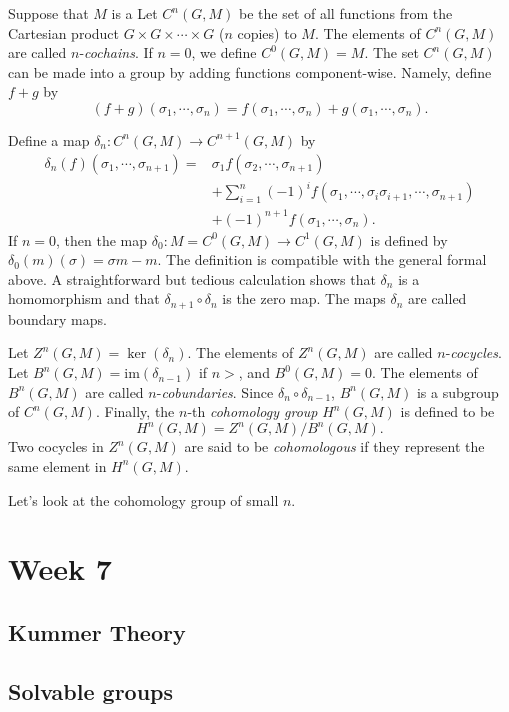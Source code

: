 \documentclass[12pt]{report}
\theoremstyle{definition}
\def\im{\text{im}}
\begin{document}
Suppose that $M$ is a Let $C^n(G,M)$ be the set of all functions from the Cartesian product $G\times G\times\cdots\times G$ ($n$ copies) to $M$. The elements of $C^n(G,M)$ are called $n$-\emph{cochains}. If $n=0$, we define $C^0(G,M)=M$. The set $C^n(G,M)$ can be made into a group by adding functions component-wise. Namely, define $f+g$  by $$(f+g)(\sigma_1,\cdots,\sigma_n)=f(\sigma_1,\cdots,\sigma_n)+g(\sigma_1,\cdots,\sigma_n).$$

Define a map $\delta_n: C^n(G,M)\to C^{n+1}(G,M)$ by \begin{align*}
    \delta_n(f)(\sigma_1,\cdots,\sigma_{n+1})=&\sigma_1f(\sigma_2,\cdots,\sigma_{n+1}) \\
    &+\sum_{i=1}^n(-1)^if(\sigma_1,\cdots,\sigma_i\sigma_{i+1},\cdots,\sigma_{n+1}) \\
    &+ (-1)^{n+1} f(\sigma_1,\cdots,\sigma_n).
\end{align*}
If $n=0$, then the map $\delta_0: M=C^0(G,M)\to C^1(G,M)$ is defined by $\delta_0(m)(\sigma)=\sigma m-m$. The definition is compatible with the general formal above. A straightforward but tedious calculation shows that $\delta_n$ is a homomorphism and that $\delta_{n+1}\circ\delta_n$ is the zero map. The maps $\delta_n$ are called boundary maps.


Let $Z^n(G,M)=\ker(\delta_n)$. The elements of $Z^n(G,M)$ are called $n$-\emph{cocycles}. Let $B^n(G,M)=\im(\delta_{n-1})$ if $n>$, and $B^0(G,M)=0$. The elements of $B^n(G,M)$ are called $n$-\emph{cobundaries}. Since $\delta_n\circ\delta_{n-1}$, $B^n(G,M)$ is a subgroup of $C^n(G,M)$. Finally, the $n$-th \emph{cohomology group} $H^n(G,M)$ is defined to be $$H^n(G,M)=Z^n(G,M)/B^n(G,M).$$ Two cocycles in $Z^n(G,M)$ are said to be \emph{cohomologous} if they represent the same element in $H^n(G,M)$.

Let's look at the cohomology group of small $n$.

\chapter*{Week 7}
\setcounter{chapter}{7}

\section{Kummer Theory}

\section{Solvable groups}
\end{document}

